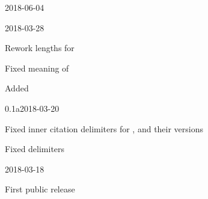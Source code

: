 \documentclass[DIV=9]{scrartcl}
\begin{document}
\begin{changelog}
\begin{release}{0.3}{2018-06-04}
\end{release}
\begin{release}{0.2}{2018-03-28}
  \item Rework lengths for 
  \item Fixed meaning of 
  \item Added 
\end{release}
\begin{release}{0.1a}{2018-03-20}
  \item Fixed inner citation delimiters for ,
     and their  versions%
  \item Fixed  delimiters
\end{release}
\begin{release}{0.1}{2018-03-18}
  \item First public release
\end{release}
\end{changelog}

\begin{bibexample}[breakable]
\printbibliography[heading=bibintoc, title={Example \refname}]
\end{bibexample}

\clearpage
\appendix
\end{document}
